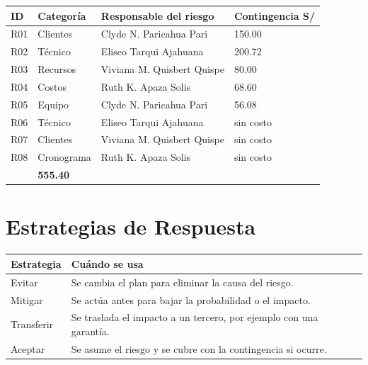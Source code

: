 \documentclass[11pt,a4paper]{article}
\begin{document}
\vspace{0.1cm}
{\small
{}
\noindent\begin{tabularx}{\textwidth}{@{}C{0.8cm} P{1.7cm} L Q{2.2cm}@{}}
\toprule
{}
\textbf{ID} & \textbf{Categoría} & \textbf{Responsable del riesgo} & \textbf{Contingencia S/} \\
\midrule
R01 & Clientes & Clyde N. Paricahua Pari & 150.00 \\
R02 & Técnico & Eliseo Tarqui Ajahuana & 200.72 \\
R03 & Recursos & Viviana M. Quisbert Quispe & 80.00 \\
R04 & Costos & Ruth K. Apaza Solis & 68.60 \\
R05 & Equipo & Clyde N. Paricahua Pari & 56.08 \\
R06 & Técnico & Eliseo Tarqui Ajahuana & \textcolor{GrisOscuro}{sin costo} \\
R07 & Clientes & Viviana M. Quisbert Quispe & \textcolor{GrisOscuro}{sin costo} \\
R08 & Cronograma & Ruth K. Apaza Solis & \textcolor{GrisOscuro}{sin costo} \\
\midrule
{} & \textbf{555.40} \\
\bottomrule
\end{tabularx}
}

\section{Estrategias de Respuesta}
{\small
{}
\noindent\begin{tabularx}{\textwidth}{@{}P{2.2cm} L@{}}
\toprule
{}
\textbf{Estrategia} & \textbf{Cuándo se usa} \\
\midrule
Evitar & Se cambia el plan para eliminar la causa del riesgo. \\
Mitigar & Se actúa antes para bajar la probabilidad o el impacto. \\
Transferir & Se traslada el impacto a un tercero, por ejemplo con una garantía. \\
Aceptar & Se asume el riesgo y se cubre con la contingencia si ocurre. \\
\bottomrule
\end{tabularx}
}
\end{document}
